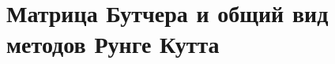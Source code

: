 \documentclass[__main__.tex]{subfiles}
\begin{document}
\section{Матрица Бутчера и общий вид методов Рунге Кутта}
\end{document}
